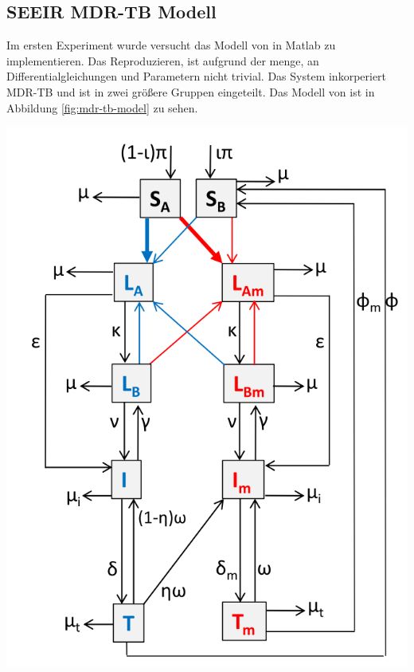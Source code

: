 \documentclass[paper=a4, fontsize=11pt, ngerman, abstract=on]{scrartcl}
\numberwithin{equation}{section} %
\numberwithin{figure}{section} %
\numberwithin{table}{section} %
\begin{document}
\subsection{SEEIR MDR-TB Modell}

Im ersten Experiment wurde versucht das Modell von \cite{Trauer2014} in Matlab zu implementieren. Das Reproduzieren, ist aufgrund der menge, an Differentialgleichungen und Parametern nicht trivial. Das System inkorperiert MDR-TB und ist in zwei größere Gruppen eingeteilt. Das Modell von \cite{Trauer2014} ist in Abbildung \ref{fig:mdr-tb-model} zu sehen.

\begin{minipage}{0.4\linewidth}
\includegraphics[width=\linewidth]{images/mdr_tb_model}
\label{fig:mdr-tb-model}
\end{minipage}\hfill
\end{document}
